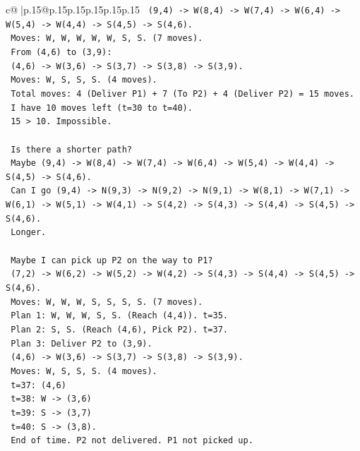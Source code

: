 \documentclass{article}
\begin{document}
{\begin{supertabular}{c@{$\;$}|p{.15\linewidth}@{}p{.15\linewidth}p{.15\linewidth}p{.15\linewidth}p{.15\linewidth}p{.15\linewidth}}
{{{\texttt{    (9,4) {-}> W(8,4) {-}> W(7,4) {-}> W(6,4) {-}> W(5,4) {-}> W(4,4) {-}> S(4,5) {-}> S(4,6).} \\
\texttt{    Moves: W, W, W, W, W, S, S. (7 moves).} \\
\texttt{    From (4,6) to (3,9):} \\
\texttt{    (4,6) {-}> W(3,6) {-}> S(3,7) {-}> S(3,8) {-}> S(3,9).} \\
\texttt{    Moves: W, S, S, S. (4 moves).} \\
\texttt{    Total moves: 4 (Deliver P1) + 7 (To P2) + 4 (Deliver P2) = 15 moves.} \\
\texttt{    I have 10 moves left (t=30 to t=40).} \\
\texttt{    15 > 10. Impossible.} \\
\\ 
\texttt{    Is there a shorter path?} \\
\texttt{    Maybe (9,4) {-}> W(8,4) {-}> W(7,4) {-}> W(6,4) {-}> W(5,4) {-}> W(4,4) {-}> S(4,5) {-}> S(4,6).} \\
\texttt{    Can I go (9,4) {-}> N(9,3) {-}> N(9,2) {-}> N(9,1) {-}> W(8,1) {-}> W(7,1) {-}> W(6,1) {-}> W(5,1) {-}> W(4,1) {-}> S(4,2) {-}> S(4,3) {-}> S(4,4) {-}> S(4,5) {-}> S(4,6).} \\
\texttt{    Longer.} \\
\\ 
\texttt{    Maybe I can pick up P2 on the way to P1?} \\
\texttt{    (7,2) {-}> W(6,2) {-}> W(5,2) {-}> W(4,2) {-}> S(4,3) {-}> S(4,4) {-}> S(4,5) {-}> S(4,6).} \\
\texttt{    Moves: W, W, W, S, S, S, S. (7 moves).} \\
\texttt{    Plan 1: W, W, W, S, S. (Reach (4,4)). t=35.} \\
\texttt{    Plan 2: S, S. (Reach (4,6), Pick P2). t=37.} \\
\texttt{    Plan 3: Deliver P2 to (3,9).} \\
\texttt{    (4,6) {-}> W(3,6) {-}> S(3,7) {-}> S(3,8) {-}> S(3,9).} \\
\texttt{    Moves: W, S, S, S. (4 moves).} \\
\texttt{    t=37: (4,6)} \\
\texttt{    t=38: W {-}> (3,6)} \\
\texttt{    t=39: S {-}> (3,7)} \\
\texttt{    t=40: S {-}> (3,8).} \\
\texttt{    End of time. P2 not delivered. P1 not picked up.} \\
}}}
\end{supertabular}}
\end{document}
